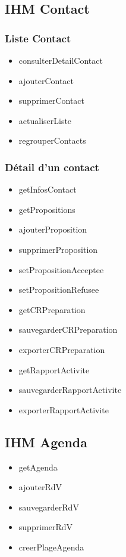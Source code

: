 	\subsection{IHM Contact}
	
		\subsubsection*{Liste Contact}
		\begin{itemize}
		\item consulterDetailContact
		\item ajouterContact 
		\item supprimerContact
		\item actualiserListe 
		\item regrouperContacts
		\end{itemize}
		
		\subsubsection*{Détail d'un contact}
		\begin{itemize}
		\item getInfosContact
		\item getPropositions
		\item ajouterProposition
		\item supprimerProposition
		\item setPropositionAcceptee
		\item setPropositionRefusee
		\item getCRPreparation
		\item sauvegarderCRPreparation
		\item exporterCRPreparation
		\item getRapportActivite
		\item sauvegarderRapportActivite
		\item exporterRapportActivite
		\end{itemize}
		
	\subsection{IHM Agenda}
		\begin{itemize}
		\item getAgenda
		\item ajouterRdV
		\item sauvegarderRdV
		\item supprimerRdV
		\item creerPlageAgenda
		\end{itemize}
		
		
		
		
		
		
		
		
		
		
		
		
		